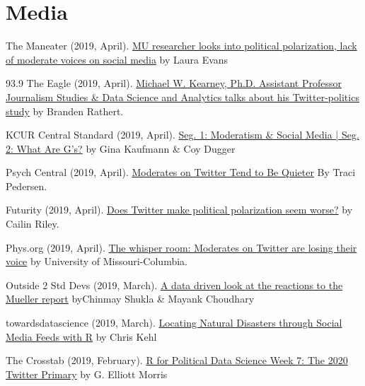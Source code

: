 \section{Media}
  \begin{bibenum}
    \item[] The Maneater (2019, April).
      \href{https://www.themaneater.com/stories/news/mu-researcher-looks-into-political-polarization-lack-of-moderate-voices-on-social-media}{MU researcher looks into political polarization, lack of moderate voices on social media} by Laura Evans
    \item[] 93.9 The Eagle (2019, April).
      \href{https://939theeagle.com/wake-up-columbia-thursday-042519/}{Michael W. Kearney, Ph.D. Assistant Professor Journalism Studies \& Data Science and Analytics talks about his Twitter-politics study} by Branden Rathert.
    \item[] KCUR Central Standard (2019, April).
      \href{https://www.kcur.org/post/seg-1-moderatism-social-media-seg-2-what-are-gs}{Seg. 1: Moderatism \& Social Media | Seg. 2: What Are G's?} by Gina Kaufmann \& Coy Dugger
    \item[] Psych Central (2019, April).
      \href{https://psychcentral.com/news/2019/04/07/moderates-on-twitter-tend-to-be-quieter/144320.html}{Moderates on Twitter Tend to Be Quieter} By Traci Pedersen.
    \item[] Futurity (2019, April).
      \href{https://www.futurity.org/political-polarization-twitter-moderates-2025862/}{Does Twitter make political polarization seem worse?} by Cailin Riley.
    \item[] Phys.org (2019, April).
      \href{https://phys.org/news/2019-04-room-moderates-twitter-voice.html}{The whisper room: Moderates on Twitter are losing their voice} by University of Missouri-Columbia.
    \item[] Outside 2 Std Devs (2019, March).
      \href{https://medium.com/@outside2SDs/a-data-driven-look-at-the-reactions-to-the-mueller-report-186b46e18d02}{A data driven look at the reactions to the Mueller report} byChinmay Shukla \& Mayank Choudhary
    \item[] towardsdatascience (2019, March).
      \href{https://towardsdatascience.com/locating-natural-disasters-through-social-media-feeds-with-r-7c8d3f078750}{Locating Natural Disasters through Social Media Feeds with R} by Chris Kehl
    \item[] The Crosstab (2019, February).
      \href{https://www.thecrosstab.com/2019/02/15/2020-twitter-primary/}{R for Political Data Science Week 7: The 2020 Twitter Primary} by G. Elliott Morris

\end{bibenum}
